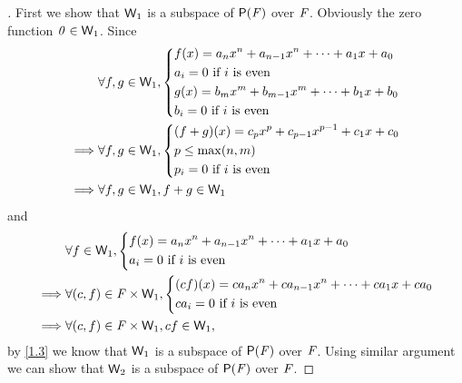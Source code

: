 \begin{proof}[]
	First we show that \(\mathsf{W}_1\) is a subspace of \(\ps{\F}\) over \(\mathit{F}\).
	Obviously the zero function \(\mathit{0} \in \mathsf{W}_1\).
	Since
	\begin{align*}
		         & \forall f, g \in \mathsf{W}_1, \begin{dcases}
			                                  f(x) = a_n x^n + a_{n - 1} x^n + \cdots + a_1 x + a_0 \\
			                                  a_i = 0 \text{ if } i \text{ is even}                 \\
			                                  g(x) = b_m x^m + b_{m - 1} x^m + \cdots + b_1 x + b_0 \\
			                                  b_i = 0 \text{ if } i \text{ is even}
		                                  \end{dcases}    \\
		\implies & \forall f, g \in \mathsf{W}_1, \begin{dcases}
			                                  (f + g)(x) = c_p x^p + c_{p - 1} x^{p - 1} + c_1 x + c_0 \\
			                                  p \leq \max(n, m)                                        \\
			                                  p_i = 0 \text{ if } i \text{ is even}
		                                  \end{dcases} \\
		\implies & \forall f, g \in \mathsf{W}_1, f + g \in \mathsf{W}_1
	\end{align*}
	and
	\begin{align*}
		         & \forall f \in \mathsf{W}_1, \begin{dcases}
			                               f(x) = a_n x^n + a_{n - 1} x^n + \cdots + a_1 x + a_0 \\
			                               a_i = 0 \text{ if } i \text{ is even}
		                               \end{dcases}                       \\
		\implies & \forall (c, f) \in \mathit{F} \times \mathsf{W}_1, \begin{dcases}
			                                              (cf)(x) = ca_n x^n + ca_{n - 1} x^n + \cdots + ca_1 x + ca_0 \\
			                                              ca_i = 0 \text{ if } i \text{ is even}
		                                              \end{dcases} \\
		\implies & \forall (c, f) \in \mathit{F} \times \mathsf{W}_1, cf \in \mathsf{W}_1,
	\end{align*}
	by \cref{1.3} we know that \(\mathsf{W}_1\) is a subspace of \(\ps{\F}\) over \(\mathit{F}\).
	Using similar argument we can show that \(\mathsf{W}_2\) is a subspace of \(\ps{\F}\) over \(\mathit{F}\).


\end{proof}
